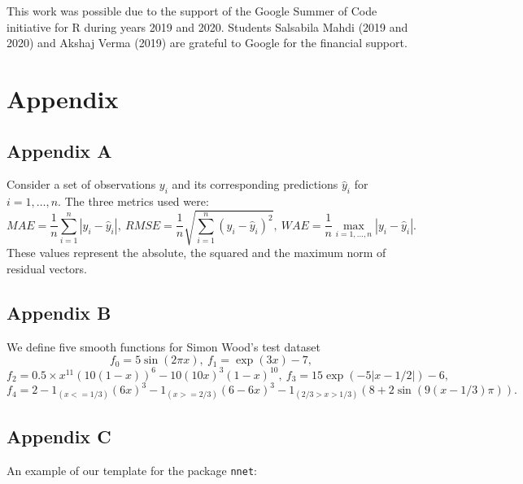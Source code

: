 This work was possible due to the support of the Google Summer of Code
initiative for R during years 2019 and 2020. Students Salsabila Mahdi
(2019 and 2020) and Akshaj Verma (2019) are grateful to Google for the
financial support.



\hypertarget{appendix}{%
\section{Appendix}\label{appendix}}

\hypertarget{appendix-a}{%
\subsection{Appendix A}\label{appendix-a}}

Consider a set of observations \(y_i\) and its corresponding predictions
\(\hat y_i\) for \(i=1,\dots,n\). The three metrics used were: \[
MAE = \frac1n\sum_{i=1}^n|y_i - \hat y_i|,~
RMSE = \frac1n\sqrt{\sum_{i=1}^n(y_i - \hat y_i)^2},~
WAE = \frac1n\max_{i=1,\dots,n}|y_i - \hat y_i|.
\] These values represent the absolute, the squared and the maximum norm
of residual vectors.

\hypertarget{appendix-b}{%
\subsection{Appendix B}\label{appendix-b}}

We define five smooth functions for Simon Wood's test dataset \[
f_0=5\sin(2\pi x),~
f_1=\exp(3x)-7,
\] \[
f_2=0.5\times x^{11}(10(1 - x))^6 - 10 (10x)^3(1 - x)^{10},~
f_3=15 \exp(-5 |x-1/2|)-6,
\] \[
f_4=2-1_{(x <= 1/3)}(6x)^3 - 1_{(x >= 2/3)} (6-6x)^3 - 
1_{(2/3 > x > 1/3)}(8+2\sin(9(x-1/3)\pi)).
\]

\hypertarget{appendix-c}{%
\subsection{Appendix C}\label{appendix-c}}

An example of our template for the package \texttt{nnet}:

